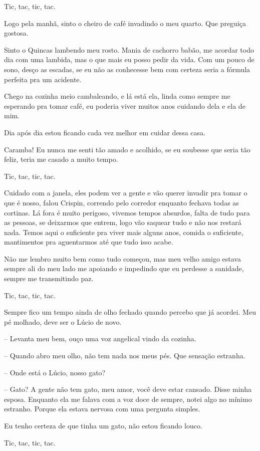 Tic, tac, tic, tac.

Logo pela manhã, sinto o cheiro de café invadindo o meu quarto. Que preguiça gostosa.

Sinto o Quincas lambendo meu rosto. Mania de cachorro babão, me acordar todo dia com uma lambida, mas o que mais eu posso pedir da vida. Com um pouco de sono, desço as escadas, se eu não as conhecesse bem com certeza seria a fórmula perfeita pra um acidente.

Chego na cozinha meio cambaleando, e lá está ela, linda como sempre me esperando pra tomar café, eu poderia viver muitos anos cuidando dela e ela de mim.

Dia após dia estou ficando cada vez melhor em cuidar dessa casa.

Caramba! Eu nunca me senti tão amado e acolhido, se eu soubesse que seria tão feliz, teria me casado a muito tempo.

Tic, tac, tic, tac.

Cuidado com a janela, eles podem ver a gente e vão querer invadir pra tomar o que é nosso, falou Crispin, correndo pelo corredor enquanto fechava todas as cortinas.
Lá fora é muito perigoso, vivemos tempos absurdos, falta de tudo para as pessoas, se deixarmos que entrem, logo vão saquear tudo e não nos restará nada.
Temos aqui o suficiente pra viver mais alguns anos, comida o suficiente, mantimentos pra aguentarmos até que tudo isso acabe.

Não me lembro muito bem como tudo começou, mas meu velho amigo estava sempre ali do meu lado me apoiando e impedindo que eu perdesse a sanidade, sempre me transmitindo paz.

Tic, tac, tic, tac.

Sempre fico um tempo ainda de olho fechado quando percebo que já acordei. Meu pé molhado, deve ser o Lúcio de novo.

-- Levanta meu bem, ouço uma voz angelical vindo da cozinha.

-- Quando abro meu olho, não tem nada nos meus pés. Que sensação estranha.

-- Onde está o Lúcio, nosso gato?

-- Gato? A gente não tem gato, meu amor, você deve estar cansado. Disse minha esposa. Enquanto ela me falava com a voz doce de sempre, notei algo no mínimo estranho. Porque ela estava nervosa com uma pergunta simples.

Eu tenho certeza de que tinha um gato, não estou ficando louco.

Tic, tac, tic, tac.

